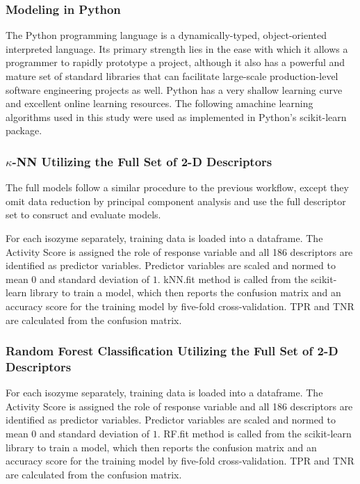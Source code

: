 \subsubsection{Modeling in Python}
The Python programming language is a dynamically-typed, object-oriented interpreted language. Its primary strength lies in the ease with which it allows a programmer to rapidly prototype a project, although it also has a powerful and mature set of standard libraries that can facilitate large-scale production-level software engineering projects as well. Python has a very shallow learning curve and excellent online learning resources. The following amachine learning algorithms used in this study were used as implemented in Python's scikit-learn package.

\subsubsection{$\kappa$-NN Utilizing the Full Set of 2-D Descriptors}
The full models follow a similar procedure to the previous workflow, except they omit data reduction by principal component analysis and use the full descriptor set to consruct and evaluate models. 

For each isozyme separately, training data is loaded into a dataframe. The Activity Score is assigned the role of response variable and all 186 descriptors are identified as predictor variables. Predictor variables are scaled and normed to mean $0$ and standard deviation of $1$. kNN.fit method is called from the scikit-learn library to train a model, which then reports the confusion matrix and an accuracy score for the training model by five-fold cross-validation. TPR and TNR are calculated from the confusion matrix.

\subsubsection{Random Forest Classification Utilizing the Full Set of 2-D Descriptors}
For each isozyme separately, training data is loaded into a dataframe. The Activity Score is assigned the role of response variable and all 186 descriptors are identified as predictor variables. Predictor variables are scaled and normed to mean $0$ and standard deviation of $1$. RF.fit method is called from the scikit-learn library to train a model, which then reports the confusion matrix and an accuracy score for the training model by five-fold cross-validation. TPR and TNR are calculated from the confusion matrix.

